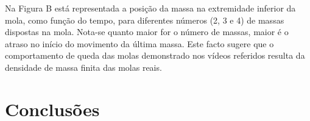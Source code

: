 \documentclass{article}
\begin{document}
Na Figura B está representada a posição da massa na extremidade inferior da
mola, como função do tempo, para diferentes números (2, 3 e 4) de massas
dispostas na mola. Nota-se quanto maior for o número de massas, maior é o
atraso no início do movimento da última massa. Este facto sugere que o
comportamento de queda das molas demonstrado nos vídeos referidos resulta da
densidade de massa finita das molas reais.

\section*{Conclusões}

\begin{figure}
  \caption{\label{fig:a}}
\end{figure}
\end{document}
